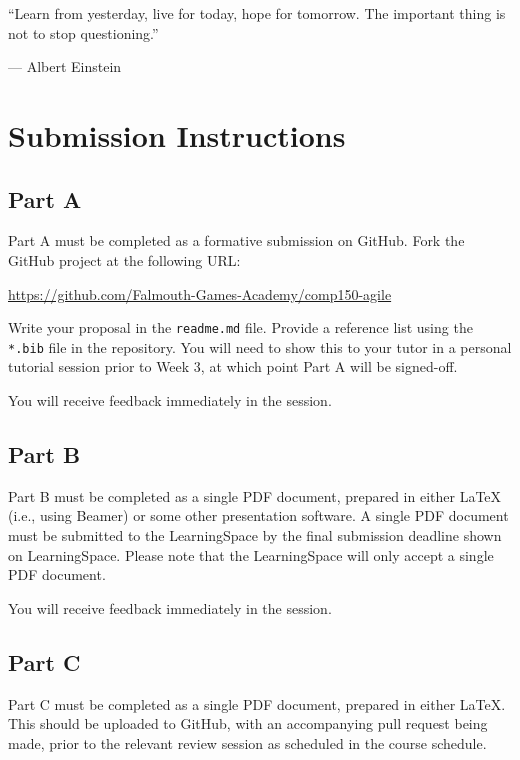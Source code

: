 \documentclass{../fal_assignment}
\begin{document}
\begin{marginquote}
    ``Learn from yesterday, live for today, hope for tomorrow. The important thing is not to stop questioning.''
    
    --- Albert Einstein
\end{marginquote}

\section*{Submission Instructions}

\subsection*{Part A}

Part A must be completed as a formative submission on GitHub. Fork the GitHub project at the following URL:

\indent \url{https://github.com/Falmouth-Games-Academy/comp150-agile}

Write your proposal in the \texttt{readme.md} file. Provide a reference list using the \texttt{*.bib} file in the repository. You will need to show this to your tutor in a personal tutorial session prior to Week 3, at which point Part A will be signed-off. 

You will receive feedback immediately in the session.

\subsection*{Part B}

Part B must be completed as a single PDF document, prepared in either LaTeX (i.e., using Beamer) or some other presentation software. A single PDF document must be submitted to the LearningSpace by the final submission deadline shown on LearningSpace. Please note that the LearningSpace will only accept a single PDF document. 

You will receive feedback immediately in the session.

\subsection*{Part C}

Part C must be completed as a single PDF document, prepared in either LaTeX. This should be uploaded to GitHub, with an accompanying pull request being made, prior to the relevant review session as scheduled in the course schedule. 
\end{document}
